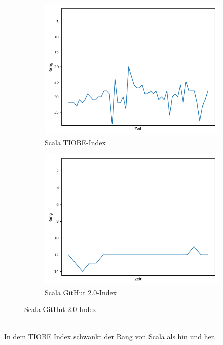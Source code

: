 \documentclass[ngerman]{article}
\begin{document}
    \begin{figure}[h!]
        \begin{subfigure}[h!]{.5\textwidth}
            \caption{Scala TIOBE-Index}
            \centering
            \includegraphics[scale=.25]{ScalaTIOBE.png}
        \end{subfigure}
        \begin{subfigure}[h!]{.5\textwidth}
            \caption{Scala GitHut 2.0-Index}
            \centering
            \includegraphics[scale=.25]{ScalaGitHut.png}
        \end{subfigure}
    \end{figure}\\
    In dem TIOBE Index schwankt der Rang von Scala als hin und her.\\
\end{document}
